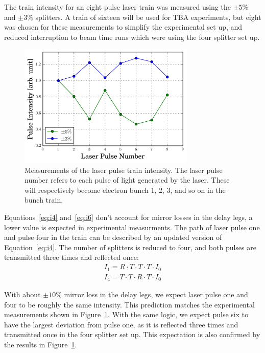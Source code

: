 The train intensity for an eight pulse laser train was measured using the $\pm5\%$ and $\pm3\%$ splitters.
A train of sixteen will be used for TBA experiments, but eight was chosen for these measurements to
simplify the experimental set up, and reduced interruption to beam time 
runs which were using the four splitter set up. 
\begin{figure}%
	\begin{center}
		\includegraphics[width=0.75\textwidth]{images/splitter_improvement}
		\caption{Measurements of the laser pulse train intensity. The laser pulse number refers to 
			each pulse of light generated by the laser. These will respectively become electron bunch 1, 2, 3, and so on
			in the bunch train.}\label{fig:origtrain}
	\end{center}
\end{figure}
Equations~\ref{eq:i4} and~\ref{eq:i6} don't account for mirror losses in the delay legs, 
a lower value is expected in experimental measurments. The path of laser pulse one and
pulse four in the train can be described by an updated version of Equation~\ref{eq:i4}.
The number of splitters is reduced to four, and both pulses are transmitted three 
times and reflected once: 
\begin{align}
I_1 = R \cdot T \cdot T \cdot T \cdot I_0 \\
I_4 = T \cdot T \cdot R \cdot T \cdot I_0 
\end{align}

With about $\pm10\%$ mirror loss in the delay legs, we expect laser pulse one and four 
to be roughly the same intensity. This prediction matches the experimental measurements 
shown in Figure~\ref{fig:origtrain}. With the same 
logic, we expect pulse six to have the largest deviation from pulse one, as it is reflected 
three times and transmitted once in the four splitter set up. This expectation is also 
confirmed by the results in Figure~\ref{fig:origtrain}.  

